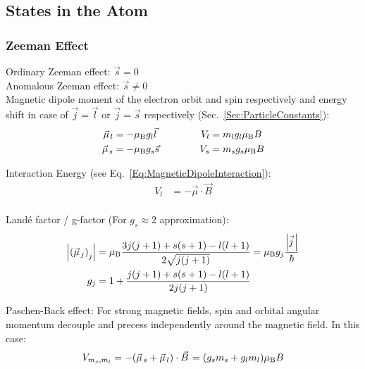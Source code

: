 	\subsection{States in the Atom}
		\subsubsection{Zeeman Effect}
			\noindent
			Ordinary Zeeman effect: $\vec{s} = 0$ \\
			Anomalous Zeeman effect: $\vec{s}\ne 0$ \\
			\noindent
			Magnetic dipole moment of the electron orbit and spin respectively and energy shift in case of $\vec{j}=\vec{l}$ or $\vec{j}=\vec{s}$ respectively (Sec.~\ref{Sec:ParticleConstants}):
			\begin{equation}
				\begin{aligned}
					\vec{\mu}_l &= -\mu_\text{B} g_l \vec{l} &\hsp V_l &= m_l g_l \mu_\text{B} B\\
					\vec{\mu}_s &= -\mu_\text{B} g_s \vec{s} &\hsp V_s &= m_s g_s \mu_\text{B} B\\
				\end{aligned}
			\end{equation}

			\noindent
			Interaction Energy (see Eq.~\ref{Eq:MagneticDipoleInteraction}):
			\begin{equation}
				\begin{aligned}
					V_l &= -\vec{\mu} \cdot \vec{B} \\
				\end{aligned}
			\end{equation}

			\noindent
			Landé factor / g-factor (For $g_s\approx 2$ approximation):
			\begin{equation}
				\begin{aligned}
					\abs{\qty(\vec{\mu}_j)_j} &= \mu_\text{B}\frac{3j(j+1)+s(s+1)-l(l+1)}{2\sqrt{j(j+1)}} = \mu_\text{B} g_j \frac{\abs{\vec{j}}}{\hbar}\\
					g_j &= 1+\frac{j(j+1) + s(s+1) - l(l+1)}{2j(j+1)} \\
				\end{aligned}
			\end{equation}

			\noindent
			Paschen-Back effect: For strong magnetic fields, spin and orbital angular momentum decouple and precess independently around the magnetic field. In this case:
			\begin{equation}
				V_{m_s,m_l} = -\qty(\vec{\mu}_s + \vec{\mu}_l)\cdot\vec{B}
				=\qty(g_s m_s + g_l m_l) \mu_\text{B} B
			\end{equation}

